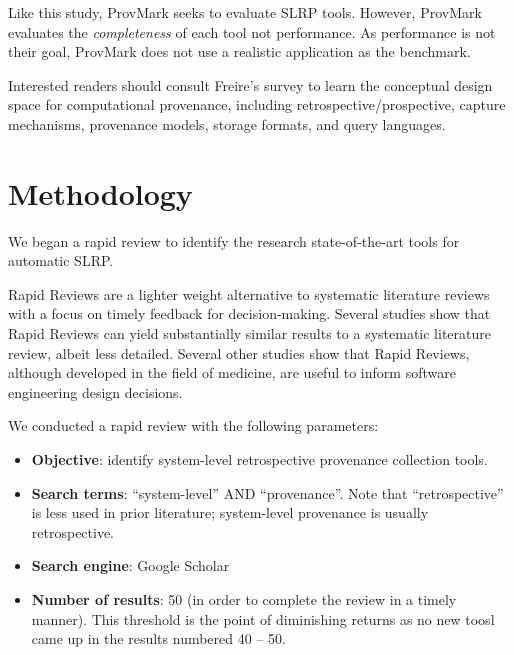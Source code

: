 Like this study, ProvMark \cite{chan_provmark_2019} seeks to evaluate SLRP tools.
However, ProvMark evaluates the \emph{completeness} of each tool not performance.
As performance is not their goal, ProvMark does not use a realistic application as the benchmark.

Interested readers should consult Freire's survey \cite{freire_provenance_2008} to learn the conceptual design space for computational provenance, including retrospective/prospective, capture mechanisms, provenance models, storage formats, and query languages.

\section{Methodology}

We began a rapid review to identify the research state-of-the-art tools for automatic SLRP.


Rapid Reviews are a lighter weight alternative to systematic literature reviews with a focus on timely feedback for decision-making.
Several studies show \cite{todo} that Rapid Reviews can yield substantially similar results to a systematic literature review, albeit less detailed.
Several other studies \cite{todo} show that Rapid Reviews, although developed in the field of medicine, are useful to inform software engineering design decisions.

We conducted a rapid review with the following parameters:

\begin{itemize}
\item \textbf{Objective}: identify system-level retrospective provenance collection tools.

\item \textbf{Search terms}: ``system-level'' AND ``provenance''.
Note that ``retrospective'' is less used in prior literature; system-level provenance is usually retrospective.

\item \textbf{Search engine}: Google Scholar

\item \textbf{Number of results}: 50 (in order to complete the review in a timely manner).
This threshold is the point of diminishing returns as no new toosl came up in the results numbered 40 -- 50.
\end{itemize}


